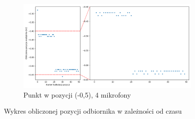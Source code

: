 \begin{figure}[H]
    \ContinuedFloat\centering
    \begin{subfigure}{\textwidth}
        \centering
        \includegraphics[width=\linewidth]{pics/mult_lat_1d/position_[-0.5]_4.png}
        \caption{Punkt w pozycji  (-0,5), 4 mikrofony}
        \label{pic:1d_mult_[-0.5]_4}
    \end{subfigure}
    \caption{Wykres obliczonej pozycji odbiornika w zależności od czasu}
    \label{fig:1d_mult_separate}
\end{figure}

